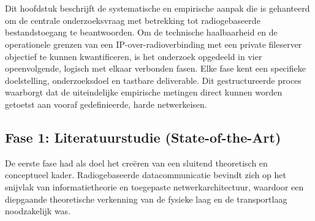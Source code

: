  
\chapter{}%
\label{ch:methodologie}
 
 
Dit hoofdstuk beschrijft de systematische en empirische aanpak die is gehanteerd om de
centrale onderzoeksvraag met betrekking tot radiogebaseerde bestandstoegang te 
beantwoorden. Om de technische haalbaarheid en de operationele grenzen van een 
IP-over-radioverbinding met een private fileserver objectief te kunnen kwantificeren, is 
het onderzoek opgedeeld in vier opeenvolgende, logisch met elkaar verbonden fasen. 
Elke fase kent een specifieke doelstelling, onderzoeksdoel en tastbare deliverable. 
Dit gestructureerde proces waarborgt dat de uiteindelijke empirische metingen direct 
kunnen worden getoetst aan vooraf gedefinieerde, harde netwerkeisen.
 
\section{Fase 1: Literatuurstudie (State-of-the-Art)}
\label{sec:meth-fase1}
 
De eerste fase had als doel het creëren van een sluitend theoretisch en conceptueel kader.
Radiogebaseerde datacommunicatie bevindt zich op het snijvlak van informatietheorie en 
toegepaste netwerkarchitectuur, waardoor een diepgaande theoretische verkenning van 
de fysieke laag en de transportlaag noodzakelijk was.
 
